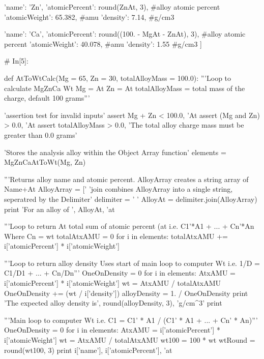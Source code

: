 \documentclass[a4paper,8pt]{article}
\begin{document}
\begin{python}
{'name': 'Zn', 
	'atomicPercent': round(ZnAt, 3), #alloy atomic percent
	'atomicWeight': 65.382, #amu
	'density': 7.14}, #g/cm3

{'name': 'Ca', 
	'atomicPercent': round((100. - MgAt - ZnAt), 3), #alloy atomic percent
	'atomicWeight': 40.078, #amu
	'density': 1.55} #g/cm3
]


# In[5]:

def AtToWtCalc(Mg = 65, Zn = 30, totalAlloyMass = 100.0):
'''Loop to calculate MgZnCa Wt%
Mg = At%
Zn = At%
totalAlloyMass = total mass of the charge, default 100 grams'''

'assertion test for invalid inputs'
assert Mg + Zn < 100.0, 'At%
assert (Mg and Zn) > 0.0, 'At%
assert totalAlloyMass > 0.0, 'The total alloy charge mass must be greater than 0.0 grams'

'Stores the analysis alloy within the Object Array function'
elements = MgZnCaAtToWt(Mg, Zn)

'''Returns alloy name and atomic percent.
AlloyArray creates a string array of Name+At%
AlloyArray = ['%
'join combines AlloyArray into a single string, seperatred by the Delimiter'
delimiter = ' '
AlloyAt = delimiter.join(AlloyArray)  
print 'For an alloy of ', AlloyAt, 'at%

'''Loop to return At%
total sum of atomic percent (at%
i.e. C1'*A1 + ... + Cn'*An
Where Cn = wt%
totalAtxAMU = 0
for i in elements:
totalAtxAMU += i['atomicPercent'] * i['atomicWeight']

'''Loop to return alloy density
Uses start of main loop to computer Wt%
i.e. 1/D = C1/D1 + ... + Cn/Dn'''
OneOnDensity = 0
for i in elements:
AtxAMU = i['atomicPercent'] * i['atomicWeight']
wt = AtxAMU / totalAtxAMU
OneOnDensity += (wt / i['density'])
alloyDensity = 1. / OneOnDensity
print 'The expected alloy density is', round(alloyDensity, 3), 'g/cm^3'
print

'''Main loop to computer Wt%
i.e. C1 = C1' * A1 / (C1' * A1 + ... + Cn' * An)'''
OneOnDensity = 0
for i in elements:
AtxAMU = i['atomicPercent'] * i['atomicWeight']
wt = AtxAMU / totalAtxAMU
wt100 = 100 * wt
wtRound = round(wt100, 3)
print i['name'], i['atomicPercent'], 'at%


\end{python}
\end{document}
